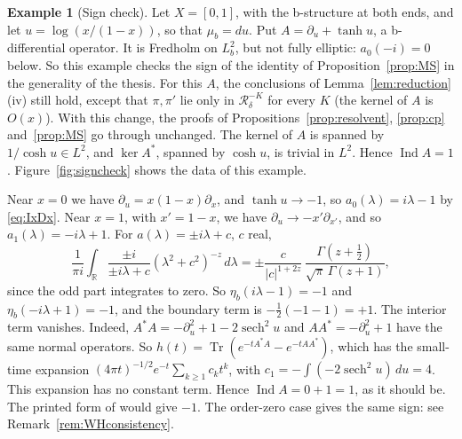 \documentclass[11pt,oneside,reqno]{article}
\DeclareMathOperator{\Tr}{Tr}
\theoremstyle{plain}
\theoremstyle{definition}
\newtheorem{example}[theorem]{Example}
\theoremstyle{remark}
\begin{document}
\begin{example}[Sign check]\label{ex:signcheck}
Let \(X=[0,1]\), with the b-structure at both ends, and let
\(u=\log(x/(1-x))\), so that \(\mu_b=du\). Put
\(A=\partial_u+\tanh u\), a b-differential operator. It is Fredholm on
\(L^2_b\), but not fully elliptic: \(a_0(-i)=0\) below. So this example
checks the sign of the identity of Proposition~\ref{prop:MS} in the
generality of the thesis. For this \(A\), the conclusions of
Lemma~\ref{lem:reduction}(iv) still hold, except that \(\pi,\pi'\) lie only
in \(\mathcal R^{-K}_\delta\) for every \(K\) (the kernel of \(A\) is
\(O(x)\)). With this change, the proofs of Propositions~\ref{prop:resolvent},
\ref{prop:cp} and~\ref{prop:MS} go through unchanged. The kernel of \(A\) is
spanned by \(1/\cosh u\in L^2\), and \(\ker A^*\), spanned by \(\cosh u\),
is trivial in \(L^2\). Hence \(\operatorname{Ind}A=1\).
Figure~\ref{fig:signcheck} shows the data of this example.

Near \(x=0\) we have \(\partial_u=x(1-x)\partial_x\), and \(\tanh u\to-1\), so
\(a_0(\lambda)=i\lambda-1\) by \eqref{eq:IxDx}. Near \(x=1\), with
\(x'=1-x\), we have \(\partial_u\to-x'\partial_{x'}\), and so
\(a_1(\lambda)=-i\lambda+1\). For \(a(\lambda)=\pm i\lambda+c\), \(c\) real,
\[
 \frac1{\pi i}\int_{\mathbb R}\frac{\pm i}{\pm i\lambda+c}
 (\lambda^2+c^2)^{-z}\,d\lambda
 =\pm\frac{c}{|c|^{1+2z}}\,
 \frac{\Gamma(z+\frac12)}{\sqrt\pi\,\Gamma(z+1)} ,
\]
since the odd part integrates to zero. So \(\eta_b(i\lambda-1)=-1\) and
\(\eta_b(-i\lambda+1)=-1\), and the boundary term is
\(-\frac12(-1-1)=+1\). The interior term vanishes. Indeed,
\(A^*A=-\partial_u^2+1-2\operatorname{sech}^2u\) and \(AA^*=-\partial_u^2+1\)
have the same normal operators. So
\(h(t)=\Tr(e^{-tA^*A}-e^{-tAA^*})\), which has the small-time expansion
\((4\pi t)^{-1/2}e^{-t}\sum_{k\geq1}c_kt^k\), with \(c_1=-\int(-2
\operatorname{sech}^2u)\,du=4\). This expansion has no constant term. Hence
\(\operatorname{Ind}A=0+1=1\), as it should be. The printed form of
\cite[Thm.~8.6]{LoyaThesis} would give \(-1\). The order-zero case gives the
same sign: see Remark~\ref{rem:WHconsistency}.
\end{example}
\end{document}
